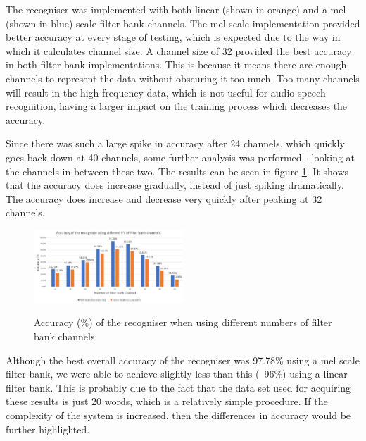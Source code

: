 \documentclass[journal]{IEEEtran}
\begin{document}
	The recogniser was implemented with both linear (shown in orange) and a mel (shown in blue) scale filter bank channels. The mel scale implementation provided better accuracy at every stage of testing, which is expected due to the way in which it calculates channel size. A channel size of 32 provided the best accuracy in both filter bank implementations. This is because it means there are enough channels to represent the data without obscuring it too much. Too many channels will result in the high frequency data, which is not useful for audio speech recognition, having a larger impact on the training process which decreases the accuracy.
	
	Since there was such a large spike in accuracy after 24 channels, which quickly goes back down at 40 channels, some further analysis was performed - looking at the channels in between these two. The results can be seen in figure \ref{fig:eval_filterbanks_zoom}. It shows that the accuracy does increase gradually, instead of just spiking dramatically. The accuracy does increase and decrease very quickly after peaking at 32 channels.
	
	\begin{figure}[!htb]
		\centering
		\captionsetup{justification=centering}
		\includegraphics[width=0.5\textwidth]{eval_filterbanks_zoom.jpg}\\
		\caption{Accuracy (\%) of the recogniser when using different numbers of filter bank channels}\label{fig:eval_filterbanks_zoom}
	\end{figure}
	
	Although the best overall accuracy of the recogniser was 97.78\% using a mel scale filter bank, we were able to achieve slightly less than this (~96\%) using a linear filter bank. This is probably due to the fact that the data set used for acquiring these results is just 20 words, which is a relatively simple procedure. If the complexity of the system is increased, then the differences in accuracy would be further highlighted.
	
\end{document}
